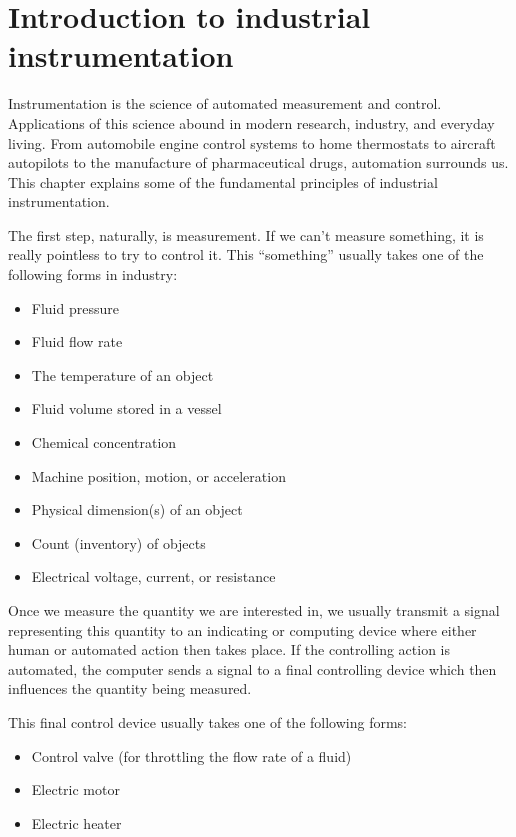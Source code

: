 
\chapter{Introduction to industrial instrumentation}

Instrumentation is the science of automated measurement and control.  Applications of this science abound in modern research, industry, and everyday living.  From automobile engine control systems to home thermostats to aircraft autopilots to the manufacture of pharmaceutical drugs, automation surrounds us.  This chapter explains some of the fundamental principles of industrial instrumentation.
 
\vskip 10pt

The first step, naturally, is measurement.  If we can't measure something, it is really pointless to try to control it.  This ``something'' usually takes one of the following forms in industry:

\begin{itemize}
\item Fluid pressure
\item Fluid flow rate
\item The temperature of an object
\item Fluid volume stored in a vessel
\item Chemical concentration
\item Machine position, motion, or acceleration
\item Physical dimension(s) of an object
\item Count (inventory) of objects
\item Electrical voltage, current, or resistance
\end{itemize}

Once we measure the quantity we are interested in, we usually transmit a signal representing this quantity to an indicating or computing device where either human or automated action then takes place.  If the controlling action is automated, the computer sends a signal to a final controlling device which then influences the quantity being measured.  

\filbreak

This final control device usually takes one of the following forms:

\begin{itemize}
\item Control valve (for throttling the flow rate of a fluid)
\item Electric motor
\item Electric heater
\end{itemize}

